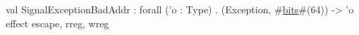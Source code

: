 val SignalExceptionBadAddr : forall ('o : Type) . (Exception, #\hyperref[zbits]{bits}#(64)) -> 'o effect {escape, rreg, wreg}
